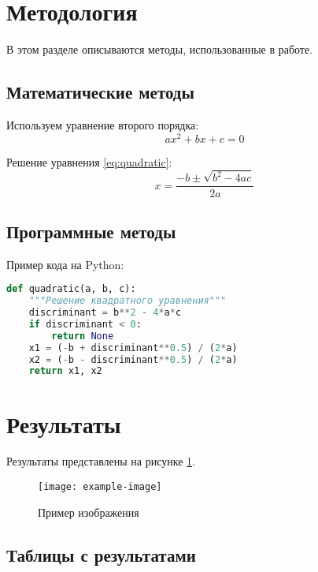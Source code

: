 \documentclass[a4paper,12pt]{article}
\begin{document}
\section{Методология}
\label{sec:methodology}

В этом разделе описываются методы, использованные в работе.

\subsection{Математические методы}
Используем уравнение второго порядка:
\begin{equation}
\label{eq:quadratic}
ax^2 + bx + c = 0
\end{equation}

Решение уравнения \eqref{eq:quadratic}:
\begin{equation}
x = \frac{-b \pm \sqrt{b^2 - 4ac}}{2a}
\end{equation}

\subsection{Программные методы}
Пример кода на Python:

\begin{lstlisting}[language=Python,caption=Пример кода]
def quadratic(a, b, c):
    """Решение квадратного уравнения"""
    discriminant = b**2 - 4*a*c
    if discriminant < 0:
        return None
    x1 = (-b + discriminant**0.5) / (2*a)
    x2 = (-b - discriminant**0.5) / (2*a)
    return x1, x2
\end{lstlisting}

\section{Результаты}
\label{sec:results}

Результаты представлены на рисунке \ref{fig:sample}.

\begin{figure}[h]
\centering
\texttt{[image: example-image]}
\caption{Пример изображения}
\label{fig:sample}
\end{figure}

\subsection{Таблицы с результатами}
\end{document}
